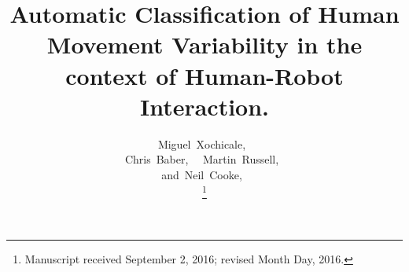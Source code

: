 \documentclass[9pt,journal,onecolumn,compsoc]{IEEEtran}
\begin{document}
%
\title{
  Automatic Classification of  Human Movement Variability  in the context of  Human-Robot Interaction.
}



%
%

\author{
 	Miguel~Xochicale,~\\
         Chris~Baber,~
         ~Martin~Russell,~ \\
         and~Neil~Cooke,~

\thanks{Manuscript received September 2, 2016; revised Month Day, 2016.}
}
\end{document}
